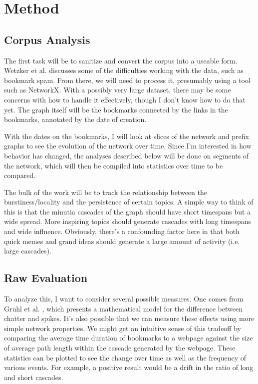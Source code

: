 \documentclass[12pt]{amsart}
\begin{document}
\section{Method}
\subsection{Corpus Analysis}
The first task will be to sanitize and convert the corpus into a useable form. Wetzker et al. \cite{wetzker} discusses some of the difficulties working with the data, such as bookmark spam. From there, we will need to process it, presumably using a tool such as NetworkX. With a possibly very large dataset, there may be some concerns with how to handle it effectively, though I don't know how to do that yet. The graph itself will be the bookmarks connected by the links in the bookmarks, annotated by the date of creation.

With the dates on the bookmarks, I will look at slices of the network and prefix graphs to see the evolution of the network over time. Since I'm interested in how behavior has changed, the analyses described below will be done on segments of the network, which will then be compiled into statistics over time to be compared.

The bulk of the work will be to track the relationship between the burstiness/locality and the persistence of certain topics. A simple way to think of this is that the minutia cascades of the graph should have short timespans but a wide spread. More inspiring topics should generate cascades with long timespans and wide influence. Obviously, there's a confounding factor here in that both quick memes and grand ideas should generate a large amount of activity (i.e. large cascades).

\subsection{Raw Evaluation}
To analyze this, I want to consider several possible measures. One comes from Gruhl et al. \cite{gruhl}, which presents a mathematical model for the difference between chatter and spikes. It's also possible that we can measure these effects using more simple network properties. We might get an intuitive sense of this tradeoff by comparing the average time duration of bookmarks to a webpage against the size of average path length within the cascade generated by the webpage. These statistics can be plotted to see the change over time as well as the frequency of various events. For example, a positive result would be a drift in the ratio of long and short cascades.
\end{document}
